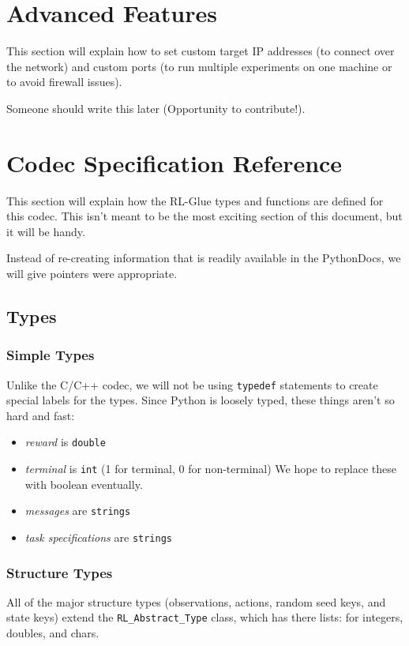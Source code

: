 \documentclass[11pt]{article}
\begin{document}
\section{Advanced Features}
This section will explain how to set custom target IP addresses (to connect over the network) and custom ports (to run multiple experiments on one machine or to avoid firewall issues).

Someone should write this later (Opportunity to contribute!).

\section{Codec Specification Reference}
This section will explain how the RL-Glue types and functions are defined for this codec.  This isn't meant to be the most exciting section of this document, but it will
be handy.

Instead of re-creating information that is readily available in the PythonDocs, we will give pointers were appropriate.

\subsection{Types}


\subsubsection{Simple Types}
Unlike the C/C++ codec, we will not be using \texttt{typedef} statements to create special labels for the types. Since Python is loosely typed, these things aren't so hard and 
fast:
\begin{itemize}
	\item \textit{reward} is \texttt{double}
	\item \textit{terminal} is \texttt{int} (1 for terminal, 0 for non-terminal) We hope to replace these with boolean eventually.
	\item \textit{messages} are \texttt{strings}
	\item \textit{task specifications} are \texttt{strings}
\end{itemize}

\def\rat{RL\_Abstract\_Type}

\subsubsection{Structure Types}
\label{sec:structure-types}
All of the major structure types (observations, actions, random seed keys, and state keys) extend the \texttt{\rat} class, which has there lists: for integers, doubles, and chars.
\end{document}
